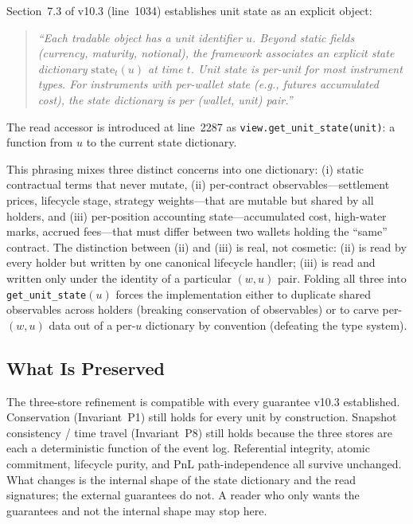\documentclass[11pt,a4paper]{article}
\begin{document}
Section~7.3 of v10.3 (line~1034) establishes unit state as an explicit object:

\begin{quote}
\textit{``Each tradable object has a unit identifier $u$. Beyond static fields (currency, maturity, notional), the framework associates an explicit state dictionary $\mathrm{state}_t(u)$ at time $t$. Unit state is per-unit for most instrument types. For instruments with per-wallet state (e.g., futures accumulated cost), the state dictionary is per (wallet, unit) pair.''}
\end{quote}

\noindent The read accessor is introduced at line~2287 as \texttt{view.get\_unit\_state(unit)}: a function from $u$ to the current state dictionary.

This phrasing mixes three distinct concerns into one dictionary: (i) static contractual terms that never mutate, (ii) per-contract observables---settlement prices, lifecycle stage, strategy weights---that are mutable but shared by all holders, and (iii) per-position accounting state---accumulated cost, high-water marks, accrued fees---that must differ between two wallets holding the ``same'' contract. The distinction between (ii) and (iii) is real, not cosmetic: (ii) is read by every holder but written by one canonical lifecycle handler; (iii) is read and written only under the identity of a particular $(w, u)$ pair. Folding all three into \texttt{get\_unit\_state}$(u)$ forces the implementation either to duplicate shared observables across holders (breaking conservation of observables) or to carve per-$(w,u)$ data out of a per-$u$ dictionary by convention (defeating the type system).

\subsection{What Is Preserved}

The three-store refinement is compatible with every guarantee v10.3 established. Conservation (Invariant~P1) still holds for every unit by construction. Snapshot consistency / time travel (Invariant~P8) still holds because the three stores are each a deterministic function of the event log. Referential integrity, atomic commitment, lifecycle purity, and PnL path-independence all survive unchanged. What changes is the internal shape of the state dictionary and the read signatures; the external guarantees do not. A reader who only wants the guarantees and not the internal shape may stop here.
\end{document}
